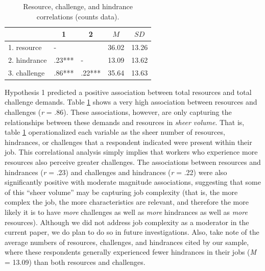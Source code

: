 \documentclass[
  man]{apa6}
\begin{document}
\begin{table}[tbp]

\begin{center}
\begin{threeparttable}

\caption{\label{tab:cortab}Resource, challenge, and hindrance correlations (counts data).}

\begin{tabular}{lllll}
\toprule
 & \multicolumn{1}{c}{1} & \multicolumn{1}{c}{2} & \multicolumn{1}{c}{$M$} & \multicolumn{1}{c}{$SD$}\\
\midrule
1. resource & - &  & 36.02 & 13.26\\
2. hindrance & .23*** & - & 13.09 & 13.62\\
3. challenge & .86*** & .22*** & 35.64 & 13.63\\
\bottomrule
\end{tabular}

\end{threeparttable}
\end{center}

\end{table}

Hypothesis 1 predicted a positive association between total resources and total challenge demands. Table \ref{tab:cortab} shows a very high association between resources and challenges (\emph{r} = .86). These associations, however, are only capturing the relationships between these demands and resources in \emph{sheer volume}. That is, table \ref{tab:cortab} operationalized each variable as the sheer number of resources, hindrances, or challenges that a respondent indicated were present within their job. This correlational analysis simply implies that workers who experience more resources also perceive greater challenges. The associations between resources and hindrances (\emph{r} = .23) and challenges and hindrances (\emph{r} = .22) were also significantly positive with moderate magnitude associations, suggesting that some of this ``sheer volume'' may be capturing job complexity (that is, the more complex the job, the more characteristics are relevant, and therefore the more likely it is to have \emph{more} challenges as well as \emph{more} hindrances as well as \emph{more} resources). Although we did not address job complexity as a moderator in the current paper, we do plan to do so in future investigations. Also, take note of the average numbers of resources, challenges, and hindrances cited by our sample, where these respondents generally experienced fewer hindrances in their jobs (\emph{M} = 13.09) than both resources and challenges.
\end{document}
